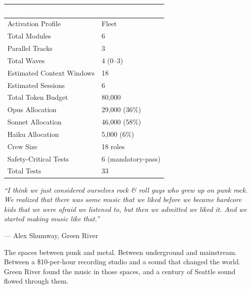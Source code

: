 \documentclass[11pt,letterpaper]{article}
\newcommand{\tableheader}[1]{\textbf{\sffamily\textcolor{white}{#1}}}
\begin{document}
\begin{center}
\begin{tabularx}{\textwidth}{L{5cm}X}
\toprule
{}
\tableheader{Metric} & \tableheader{Value} \\
\midrule
Activation Profile & Fleet \\
Total Modules & 6 \\
Parallel Tracks & 3 \\
Total Waves & 4 (0--3) \\
Estimated Context Windows & 18 \\
Estimated Sessions & 6 \\
Total Token Budget & 80,000 \\
Opus Allocation & 29,000 (36\%) \\
Sonnet Allocation & 46,000 (58\%) \\
Haiku Allocation & 5,000 (6\%) \\
Crew Size & 18 roles \\
Safety-Critical Tests & 6 (mandatory-pass) \\
Total Tests & 33 \\
\bottomrule
\end{tabularx}
\end{center}

\vspace{1em}

\begin{quotebox}
\textit{``I think we just considered ourselves rock \& roll guys who grew up on punk rock. We realized that there was some music that we liked before we became hardcore kids that we were afraid we listened to, but then we admitted we liked it. And we started making music like that.''}

\vspace{0.5em}
\hfill --- Alex Shumway, Green River

\vspace{1em}
The spaces between punk and metal. Between underground and mainstream. Between a \$10-per-hour recording studio and a sound that changed the world. Green River found the music in those spaces, and a century of Seattle sound flowed through them.
\end{quotebox}
\end{document}
